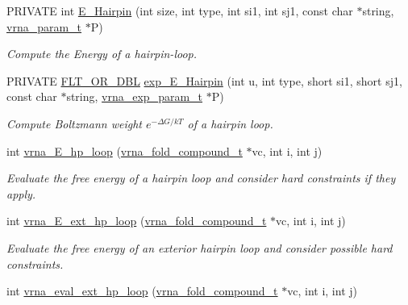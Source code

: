 \begin{DoxyCompactItemize}
\item 
P\+R\+I\+V\+A\+TE int \hyperlink{group__loops_gadf943ee9a45b7f4cee9192c06210dace}{E\+\_\+\+Hairpin} (int size, int type, int si1, int sj1, const char $\ast$string, \hyperlink{group__energy__parameters_ga8a69ca7d787e4fd6079914f5343a1f35}{vrna\+\_\+param\+\_\+t} $\ast$P)
\begin{DoxyCompactList}\small\item\em Compute the Energy of a hairpin-\/loop. \end{DoxyCompactList}\item 
P\+R\+I\+V\+A\+TE \hyperlink{group__data__structures_ga31125aeace516926bf7f251f759b6126}{F\+L\+T\+\_\+\+O\+R\+\_\+\+D\+BL} \hyperlink{group__loops_ga51fb555974f180b78d76142b2894851c}{exp\+\_\+\+E\+\_\+\+Hairpin} (int u, int type, short si1, short sj1, const char $\ast$string, \hyperlink{group__energy__parameters_ga01d8b92fe734df8d79a6169482c7d8d8}{vrna\+\_\+exp\+\_\+param\+\_\+t} $\ast$P)
\begin{DoxyCompactList}\small\item\em Compute Boltzmann weight $e^{-\Delta G/kT} $ of a hairpin loop. \end{DoxyCompactList}\item 
int \hyperlink{group__loops_ga999ba163a8148d72fd5f22819a681df7}{vrna\+\_\+\+E\+\_\+hp\+\_\+loop} (\hyperlink{group__fold__compound_ga1b0cef17fd40466cef5968eaeeff6166}{vrna\+\_\+fold\+\_\+compound\+\_\+t} $\ast$vc, int i, int j)
\begin{DoxyCompactList}\small\item\em Evaluate the free energy of a hairpin loop and consider hard constraints if they apply. \end{DoxyCompactList}\item 
int \hyperlink{group__loops_gac3393ee309372eccae944e3a07f455f9}{vrna\+\_\+\+E\+\_\+ext\+\_\+hp\+\_\+loop} (\hyperlink{group__fold__compound_ga1b0cef17fd40466cef5968eaeeff6166}{vrna\+\_\+fold\+\_\+compound\+\_\+t} $\ast$vc, int i, int j)
\begin{DoxyCompactList}\small\item\em Evaluate the free energy of an exterior hairpin loop and consider possible hard constraints. \end{DoxyCompactList}\item 
\mbox{\label{group__loops_gad3b92453a6b501856eec8fae39f3235d}} 
int \hyperlink{group__loops_gad3b92453a6b501856eec8fae39f3235d}{vrna\+\_\+eval\+\_\+ext\+\_\+hp\+\_\+loop} (\hyperlink{group__fold__compound_ga1b0cef17fd40466cef5968eaeeff6166}{vrna\+\_\+fold\+\_\+compound\+\_\+t} $\ast$vc, int i, int j)

\end{DoxyCompactItemize}
